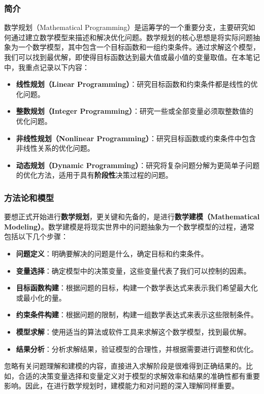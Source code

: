 \documentclass[12pt]{article}
\theoremstyle{plain}
\theoremstyle{definition}
\begin{document}
\subsubsection{简介}\label{subsubsec:intro}

数学规划（Mathematical Programming）是运筹学的一个重要分支，主要研究如何通过建立数学模型来描述和解决优化问题。数学规划的核心思想是将实际问题抽象为一个数学模型，其中包含一个目标函数和一组约束条件。通过求解这个模型，我们可以找到最优解，即使得目标函数达到最大值或最小值的变量取值。在本笔记中，我重点记录以下内容：
\begin{itemize}
    \item \textbf{线性规划（Linear Programming）}：研究目标函数和约束条件都是线性的优化问题。
    \item \textbf{整数规划（Integer Programming）}：研究一些或全部变量必须取整数值的优化问题。
    \item \textbf{非线性规划（Nonlinear Programming）}：研究目标函数或约束条件中包含非线性关系的优化问题。
    \item \textbf{动态规划（Dynamic Programming）}：研究将复杂问题分解为更简单子问题的优化方法，适用于具有\textbf{阶段性}决策过程的问题。
\end{itemize}

\subsubsection{方法论和模型}\label{subsubsec:methodology}

要想正式开始进行\textbf{数学规划}，更关键和先备的，是进行\textbf{数学建模（Mathematical Modeling）}。数学建模是将现实世界中的问题抽象为一个数学模型的过程，通常包括以下几个步骤：
\begin{itemize}
    \item \textbf{问题定义}：明确要解决的问题是什么，确定目标和约束条件。
    \item \textbf{变量选择}：确定模型中的决策变量，这些变量代表了我们可以控制的因素。
    \item \textbf{目标函数构建}：根据问题的目标，构建一个数学表达式来表示我们希望最大化或最小化的量。
    \item \textbf{约束条件构建}：根据问题的限制，构建一组数学表达式来表示这些限制条件。
    \item \textbf{模型求解}：使用适当的算法或软件工具来求解这个数学模型，找到最优解。
    \item \textbf{结果分析}：分析求解结果，验证模型的合理性，并根据需要进行调整和优化。
\end{itemize}
忽略有关问题理解和建模的内容，直接进入求解阶段是很难得到正确结果的。比如，合适的决策变量选择和变量定义对于模型的求解效率和结果的准确性都有重要影响。因此，在进行数学规划时，建模能力和对问题的深入理解同样重要。
\end{document}
